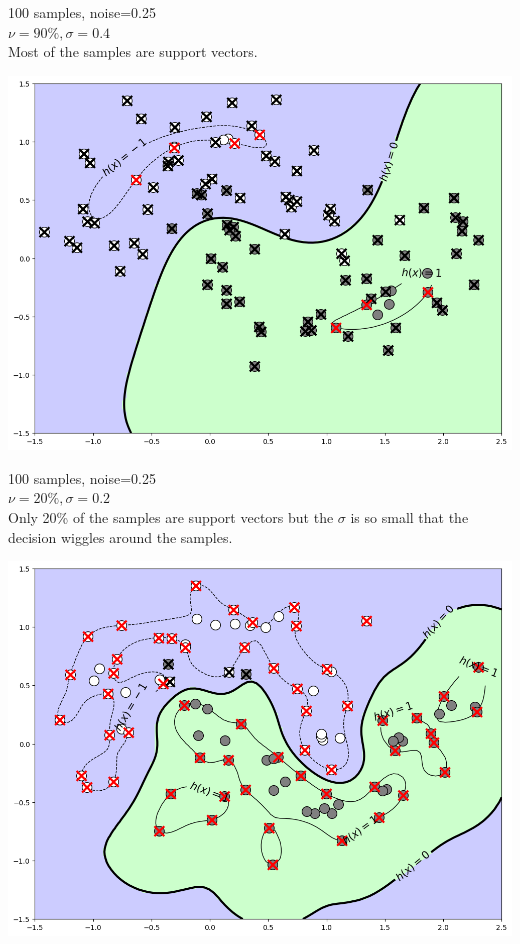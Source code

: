 \documentclass{article}
\begin{document}
\begin{multicols*}{3}
\begin{minipage}{0.5\columnwidth}
	100 samples, noise=0.25\\
	$\nu=90\% ,\sigma=0.4$\\
	Most of the samples are support vectors. \columnbreak  
\end{minipage}
\begin{minipage}{0.4\columnwidth}
\includegraphics[width=\columnwidth]{nusvc003.png}
\end{minipage}

\begin{minipage}{0.5\columnwidth}
	100 samples, noise=0.25\\
	$\nu=20\% ,\sigma=0.2$\\
	Only 20\% of the samples are support vectors but the $\sigma$ is so small that the decision wiggles around the samples. \columnbreak  
\end{minipage}
\begin{minipage}{0.4\columnwidth}
\includegraphics[width=\columnwidth]{nusvc004.png}
\end{minipage}

\end{multicols*}
\end{document}
